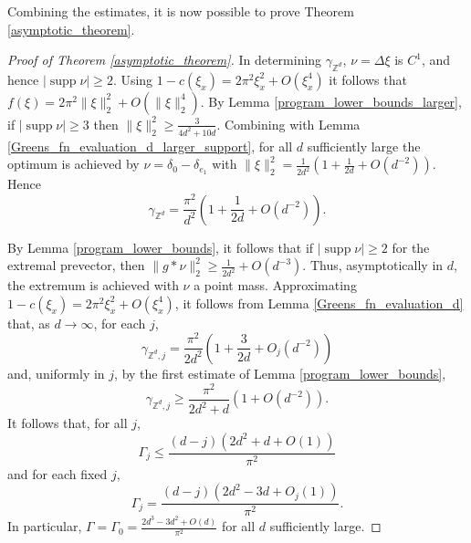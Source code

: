 \documentclass[a4paper, 12pt, notitlepage]{amsart}
\newcommand{\supp}{\operatorname{supp}}
\newcommand{\zed}{\mathbb{Z}}
\theoremstyle{remark}
\begin{document}
Combining the estimates, it is now possible to prove Theorem \ref{asymptotic_theorem}.

\begin{proof}[Proof of Theorem \ref{asymptotic_theorem}]
 In determining $\gamma_{\zed^d}$, $\nu = \Delta \xi$ is $C^1$, and hence $|\supp \nu| \geq 2$.  Using $1- c(\xi_x) = 2\pi^2 \xi_x^2 + O(\xi_x^4)$ it follows that $f(\xi) = 2\pi^2 \|\xi\|_2^2 + O(\|\xi\|_2^4)$. By Lemma \ref{program_lower_bounds_larger}, if $|\supp \nu| \geq 3$ then $\|\xi\|_2^2 \geq \frac{3}{4d^2 + 10d}$.  Combining with Lemma \ref{Greens_fn_evaluation_d_larger_support}, for all $d$ sufficiently large the optimum is achieved by $\nu = \delta_0 - \delta_{e_1}$ with
 $\|\xi\|_2^2 = \frac{1}{2d^2}\left(1 + \frac{1}{2d} + O\left(d^{-2}\right)\right)$.  Hence
 \begin{equation}
  \gamma_{\zed^d} = \frac{\pi^2}{d^2}\left(1 + \frac{1}{2d} + O\left(d^{-2}\right)\right).
 \end{equation}


By Lemma \ref{program_lower_bounds}, it follows that if $|\supp \nu| \geq 2$ for the extremal prevector, then $\|g*\nu\|_2^2 \geq \frac{1}{2d^2} + O(d^{-3})$. Thus, asymptotically in $d$, the extremum is achieved with $\nu$ a point mass. 
Approximating $1-c(\xi_x) = 2\pi^2 \xi_x^2 + O(\xi_x^4)$, it follows from Lemma \ref{Greens_fn_evaluation_d} that, as $d \to \infty$, for each $j$,
\begin{equation}
 \gamma_{\zed^d,j} = \frac{\pi^2}{2d^2} \left(1 + \frac{3}{2d} + O_j(d^{-2})\right)
\end{equation}
and, uniformly in $j$, by the first estimate of Lemma \ref{program_lower_bounds},
\begin{equation}
 \gamma_{\zed^d, j} \geq \frac{\pi^2}{2d^2 + d}(1 + O(d^{-2})).
\end{equation}
It follows that, for all $j$,
\begin{equation}
 \Gamma_j \leq \frac{(d-j)(2d^2 + d + O(1))}{\pi^2} 
\end{equation}
and for each fixed $j$,
\begin{equation}
 \Gamma_j = \frac{(d-j) (2d^2 -3d + O_j(1))}{\pi^2}.
\end{equation}
In particular, $\Gamma = \Gamma_0 = \frac{2d^3 -3d^2 + O(d)}{\pi^2}$ for all $d$ sufficiently large.



\end{proof}
\end{document}
